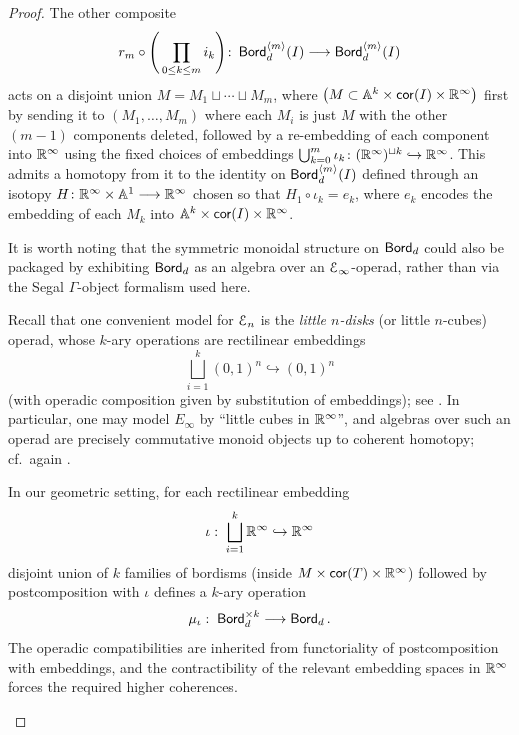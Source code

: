 \begin{proof}
    The other composite
    \begin{equation}
          r_{m} \circ \Bigg(\prod_{0\leq k \leq m} i_k \Bigg) \colon \operatorname{\mathsf{Bord}}_{d}^{\langle m \rangle}(I) \longrightarrow \operatorname{\mathsf{Bord}}_{d}^{\langle m \rangle}(I)
    \end{equation}
    acts on a disjoint union $M = M_1 \sqcup \cdots \sqcup M_m$,  where $\big(M \subset \mathbb A^{k} \times \mathsf{cor}(I)\times \mathbb R^{\operatorname{\infty}}\big)$ first by sending it to $(M_1,\ldots, M_m)$ where each $M_i$ is just $M$ with the other $(m-1)$ components deleted, followed by a re-embedding of each component into $\mathbb R^{\operatorname{\infty}}$ using the fixed choices of embeddings $\bigcup_{k = 0}^{m}\iota_k \colon (\mathbb R^{\operatorname{\infty}})^{\sqcup k} \hookrightarrow \mathbb R^{\operatorname{\infty}}$. This admits a homotopy from it to the identity on $\operatorname{\mathsf{Bord}}_{d}^{\langle m \rangle}(I)$ defined through an isotopy $H\colon \mathbb R^{\operatorname{\infty}}\times \mathbb A^{1} \longrightarrow \mathbb R^{\operatorname{\infty}}$ chosen so that $H_1 \circ \iota_k = e_k$, where $e_k$ encodes the embedding of each $M_k$ into $\mathbb A^{k}\times \mathsf{cor}(I)\times \mathbb R^{\operatorname{\infty}}$.   

    \begin{remark}\label{ch43:: rem :operadic-symm-monoidal}
        It is worth noting that the symmetric monoidal structure on $\operatorname{\mathsf{Bord}}_d$ could also be packaged by exhibiting $\operatorname{\mathsf{Bord}}_d$ as an algebra over an $\mathcal E_\infty$-operad, rather than via the Segal $\Gamma$-object formalism used here.

        Recall that one convenient model for $\mathcal E_n$ is the \emph{little $n$-disks} (or little $n$-cubes) operad, whose $k$-ary operations are rectilinear embeddings
        \begin{equation}
        \bigsqcup_{i=1}^k (0,1)^n \hookrightarrow (0,1)^n
        \end{equation}
        (with operadic composition given by substitution of embeddings); see \cite[\S5.1.1]{LurieHA}.
        In particular, one may model $E_\infty$ by ``little cubes in $\mathbb R^\infty$'', and algebras over such an operad are precisely commutative monoid objects up to coherent homotopy; cf.\ again \cite[\S5.1.1]{LurieHA}.

        In our geometric setting, for each rectilinear embedding
        \begin{equation}
        \iota:\;\bigsqcup_{i=1}^k \mathbb R^\infty \hookrightarrow \mathbb R^\infty
        \end{equation}
        disjoint union of $k$ families of bordisms (inside $M\times \operatorname{{\sf cor}}(T)\times \mathbb R^\infty$) followed by postcomposition with $\iota$ defines a $k$-ary operation
        \begin{equation}
        \mu_\iota:\;\operatorname{\mathsf{Bord}}_{d}^{\times k}\longrightarrow \operatorname{\mathsf{Bord}}_{d}.
        \end{equation}
        The operadic compatibilities are inherited from functoriality of postcomposition with embeddings, and the contractibility of the relevant embedding spaces in $\mathbb R^\infty$ forces the required higher coherences.


\end{remark}
\end{proof}
